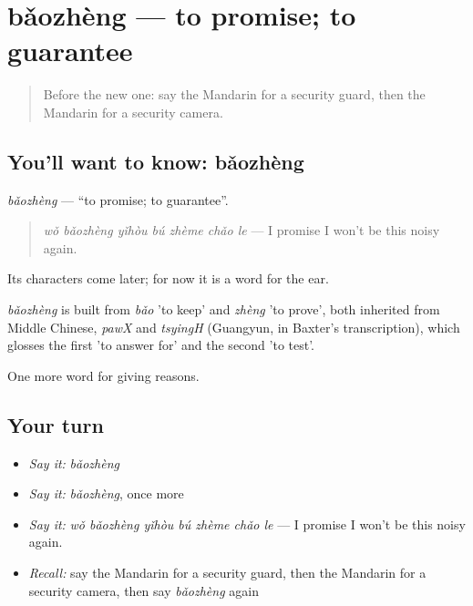 \section[bǎozhèng]{bǎozhèng — to promise; to guarantee}

\label{lesson:ZH-C382-baozheng}



\begin{quote}
Before the new one: say the Mandarin for a security guard, then the Mandarin for a security camera.
\end{quote}

\subsection*{You'll want to know: bǎozhèng}
\emph{bǎozhèng} — \textquotedblleft{}to promise; to guarantee\textquotedblright{}.

\begin{quote}
\emph{wǒ bǎozhèng yǐhòu bú zhème chǎo le} — I promise I won't be this noisy again.
\end{quote}

Its characters come later; for now it is a word for the ear.

\begin{cousinweb}
\emph{bǎozhèng} is built from \emph{bǎo} 'to keep' and \emph{zhèng} 'to prove', both inherited from Middle Chinese, \emph{pawX} and \emph{tsyingH} (Guangyun, in Baxter's transcription), which glosses the first 'to answer for' and the second 'to test'.
\end{cousinweb}

\begin{grammarlens}[title={What you've built}]
One more word for giving reasons.
\end{grammarlens}

\subsection*{Your turn}
\begin{itemize}
\raggedright
  \item \emph{Say it:} \emph{bǎozhèng}
  \item \emph{Say it:} \emph{bǎozhèng}, once more
  \item \emph{Say it:} \emph{wǒ bǎozhèng yǐhòu bú zhème chǎo le} — I promise I won't be this noisy again.
  \item \emph{Recall:} say the Mandarin for a security guard, then the Mandarin for a security camera, then say \emph{bǎozhèng} again
\end{itemize}

